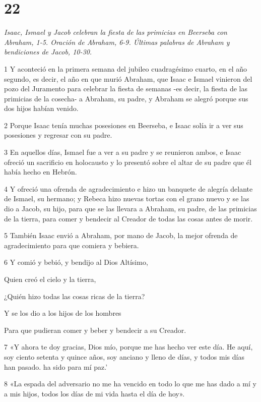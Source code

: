 \chapter{22}

\par \textit{Isaac, Ismael y Jacob celebran la fiesta de las primicias en Beerseba con Abraham, 1-5. Oración de Abraham, 6-9. Últimas palabras de Abraham y bendiciones de Jacob, 10-30.}

\par 1 Y aconteció en la primera semana del jubileo cuadragésimo cuarto, en el año segundo, es decir, el año en que murió Abraham, que Isaac e Ismael vinieron del pozo del Juramento para celebrar la fiesta de semanas -es decir, la fiesta de las primicias de la cosecha- a Abraham, su padre, y Abraham se alegró porque sus dos hijos habían venido.
\par 2 Porque Isaac tenía muchas posesiones en Beerseba, e Isaac solía ir a ver sus posesiones y regresar con su padre.
\par 3 En aquellos días, Ismael fue a ver a su padre y se reunieron ambos, e Isaac ofreció un sacrificio en holocausto y lo presentó sobre el altar de su padre que él había hecho en Hebrón.
\par 4 Y ofreció una ofrenda de agradecimiento e hizo un banquete de alegría delante de Ismael, su hermano; y Rebeca hizo nuevas tortas con el grano nuevo y se las dio a Jacob, su hijo, para que se las llevara a Abraham, su padre, de las primicias de la tierra, para comer y bendecir al Creador de todas las cosas antes de morir.
\par 5 También Isaac envió a Abraham, por mano de Jacob, la mejor ofrenda de agradecimiento para que comiera y bebiera.
\par 6 Y comió y bebió, y bendijo al Dios Altísimo,
\par    
\par     Quien creó el cielo y la tierra,  
\par     ¿Quién hizo todas las cosas ricas de la tierra?  
\par     Y se los dio a los hijos de los hombres  
\par     Para que pudieran comer y beber y bendecir a su Creador.
\par    
\par 7 «Y ahora te doy gracias, Dios mío, porque me has hecho ver este día. He aquí, soy ciento setenta y quince años, soy anciano y lleno de días, y todos mis días han pasado. ha sido para mí paz.'
\par 8 «La espada del adversario no me ha vencido en todo lo que me has dado a mí y a mis hijos, todos los días de mi vida hasta el día de hoy».
